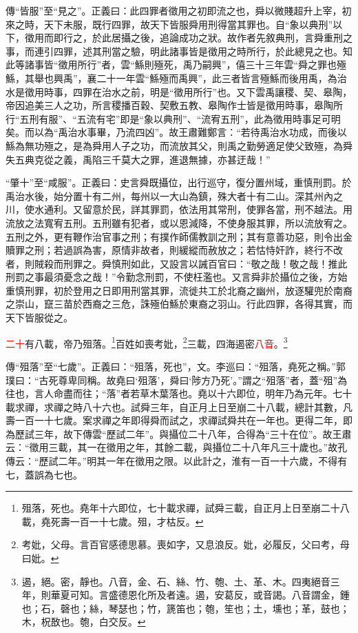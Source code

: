 {\noindent\zhuan{}\fzbyks 傳“皆服”至“見之”。正義曰：此四罪者徵用之初即流之也，舜以微賤超升上宰，初來之時，天下未服，既行四罪，故天下皆服舜用刑得當其罪也。自“象以典刑”以下，徵用而即行之，於此居攝之後，追論成功之狀。故作者先敘典刑，言舜重刑之事，而連引四罪，述其刑當之驗，明此諸事皆是徵用之時所行，於此總見之也。知此等諸事皆“徵用所行”者，雲“鯀則殛死，禹乃嗣興”，僖三十三年雲“舜之罪也殛鯀，其舉也興禹”，襄二十一年雲“鯀殛而禹興”，此三者皆言殛鯀而後用禹，為治水是徵用時事，四罪在治水之前，明是“徵用所行”也。又下雲禹讓稷、契、皋陶，帝因追美三人之功，所言稷播百穀、契敷五教、皋陶作士皆是徵用時事，皋陶所行“五刑有服”、“五流有宅”即是“象以典刑”、“流宥五刑”，此為徵用時事足可明矣。而以為“禹治水事畢，乃流四凶”。故王肅難鄭言：“若待禹治水功成，而後以鯀為無功殛之，是為舜用人子之功，而流放其父，則禹之勤勞適足使父致殛，為舜失五典克從之義，禹陷三千莫大之罪，進退無據，亦甚迂哉！” \par}

{\noindent\shu{}\fzkt “肇十”至“咸服”。正義曰：史言舜既攝位，出行巡守，復分置州域，重慎刑罰。於禹治水後，始分置十有二州，每州以一大山為鎮，殊大者十有二山。深其州內之川，使水通利。又留意於民，詳其罪罰，依法用其常刑，使罪各當，刑不越法。用流放之法寬宥五刑。五刑雖有犯者，或以恩減降，不使身服其罪，所以流放宥之。五刑之外，更有鞭作治官事之刑；有撲作師儒教訓之刑；其有意善功惡，則令出金贖罪之刑；若過誤為害，原情非故者，則緩縱而赦放之；若怙恃奸詐，終行不改者，則賊殺而刑罪之。舜慎刑如此，又設言以誡百官曰：“敬之哉！敬之哉！推此刑罰之事最須憂念之哉！”令勤念刑罰，不使枉濫也。又言舜非於攝位之後，方始重慎刑罪，初於登用之日即用刑當其罪，流徙共工於北裔之幽州，放逐驩兜於南裔之崇山，竄三苗於西裔之三危，誅殛伯鯀於東裔之羽山。行此四罪，各得其實，而天下皆服從之。 \par}

\textcolor{red}{二十}有八載，帝乃殂落。\footnote{殂落，死也。堯年十六即位，七十載求禪，試舜三載，自正月上日至崩二十八載，堯死壽一百一十七歲。殂，才枯反。}百姓如喪考妣，\footnote{考妣，父母。言百官感德思慕。喪如字，又息浪反。妣，必履反，父曰考，母曰妣。}三載，四海遏密\textcolor{red}{八音}。\footnote{遏，絕。密，靜也。八音，金、石、絲、竹、匏、土、革、木。四夷絕音三年，則華夏可知。言盛德恩化所及者遠。遏，安葛反，或音謁。八音謂金，鍾也；石，磬也；絲，琴瑟也；竹，篪笛也；匏，笙也；土，壎也；革，鼓也；木，柷敔也。匏，白交反。}

{\noindent\zhuan{}\fzbyks 傳“殂落”至“七歲”。正義曰：“殂落，死也”，文。李巡曰：“殂落，堯死之稱。”郭璞曰：“古死尊卑同稱。故堯曰‘殂落’，舜曰‘陟方乃死’。”謂之“殂落”者，蓋“殂”為往也，言人命盡而往；“落”者若草木葉落也。堯以十六即位，明年乃為元年。七十載求禪，求禪之時八十六也。試舜三年，自正月上日至崩二十八載，總計其數，凡壽一百一十七歲。案求禪之年即得舜而試之，求禪試舜共在一年也。更得二年，即為歷試三年，故下傳雲“歷試二年”。與攝位二十八年，合得為“三十在位”。故王肅云：“徵用三載，其一在徵用之年，其餘二載，與攝位二十八年凡三十歲也。”故孔傳云：“歷試二年。”明其一年在徵用之限。以此計之，淮有一百一十六歲，不得有七，蓋誤為七也。 \par}

